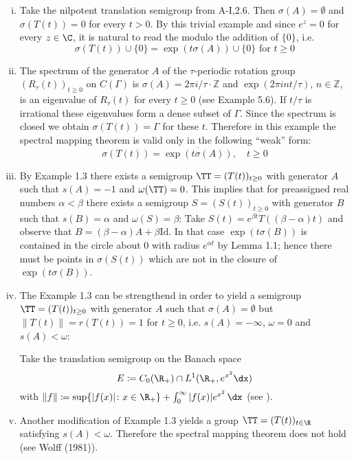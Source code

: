 \begin{enumerate}[(i), wide]

\item
Take the nilpotent translation semigroup from A-I,2.6. Then $\sigma(A) = \emptyset$ and $\sigma(T(t)) = 0$ for every $t > 0$.
By this trivial example and since $e^{z} = 0$ for every $z \in \C$, it is natural to read the  modulo the addition of $\{0\}$, i.e.
\[
\sigma(T(t)) \cup \{0\} = \exp(t\sigma(A)) \cup \{0\} \text{ for } t \geq 0
\]
\item
The spectrum of the generator $A$ of the $\tau$-periodic rotation group $(R_{\tau}(t))_{t \geq 0}$ on $C(\Gamma)$ is $\sigma(A) = 2\pi i/\tau\cdot\mathbb{Z}$ and $\exp(2\pi int/\tau)$, $n \in \mathbb{Z}$, is an eigenvalue of $R_{\tau}(t)$ for every $t \geq 0$ (see Example 5.6).
If $t/\tau$ is irrational these eigenvalues form a dense subset of $\Gamma$.
Since the spectrum is closed we obtain $\sigma(T(t)) = \Gamma$ for these $t$.
Therefore in this example the spectral mapping theorem is valid only in the following \enquote{weak} form:
\[
\sigma(T(t)) = \overline{\exp(t\sigma(A))}, \quad t \geq 0
\]

\item 
By Example 1.3 there exists a semigroup $\TT = (T(t))_{t \geq 0}$ with generator $A$ such that $s(A) = -1$ and $\omega(\TT) = 0$.
This implies that for preassigned real numbers $\alpha < \beta$ there exists a semigroup $S = (S(t))_{t \geq 0}$ with generator $B$ such that $s(B) = \alpha$ and $\omega(S) = \beta$: Take $S(t) = e^{\beta t}T((\beta - \alpha)t)$ and observe that $B = (\beta-\alpha)A + \beta\text{Id}$.
In that case $\exp(t\sigma(B))$ is contained in the circle about $0$ with radius $e^{\alpha t}$ by Lemma 1.1; hence there must be points in $\sigma(S(t))$ which are not in the closure of $\exp(t\sigma(B))$.

\item 
The Example 1.3 can be strengthend in order to yield a semigroup $\TT = (T(t))_{t \geq 0}$ with generator $A$ such that $\sigma(A) = \emptyset$ but $\|T(t)\| = r(T(t)) = 1$ for $t \geq 0$, i.e. $s(A) = -\infty$, $\omega = 0$ and $s(A) < \omega$:



Take the translation semigroup on the Banach space
\[
E \coloneqq C_{0}(\R_{+}) \cap L^{1}(\R_{+}, e^{x^{2}}\dx)
\]
with $\|f\| \coloneqq \sup \{|f(x)| \colon x \in \R_{+}\} + \int_{0}^{\infty} |f(x)|e^{x^{2}} \, \dx$ (see \citet{greinervoigtwolff:1981}).

\item 
Another modification of Example 1.3 yields a group $\TT = (T(t))_{t \in \R}$ satisfying $s(A) < \omega$.
Therefore the spectral mapping theorem does not hold (see Wolff (1981)).
\end{enumerate}

